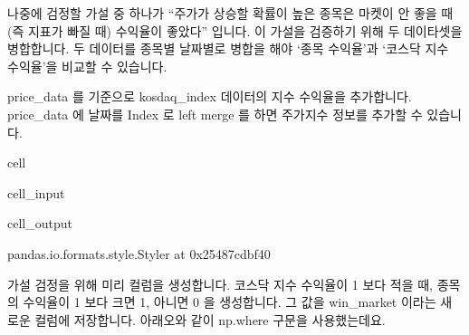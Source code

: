 \documentclass[letterpaper,10pt,english]{jupyterBook}
\begin{document}
\sphinxAtStartPar
 나중에 검정할 가설 중 하나가 “주가가 상승할 확률이 높은 종목은 마켓이 안 좋을 때(즉 지표가 빠질 때) 수익율이 좋았다” 입니다. 이 가설을 검증하기 위해 두 데이타셋을 병합합니다. 두 데이터를 종목별 날짜별로 병합을 해야 ‘종목 수익율’과 ‘코스닥 지수 수익율’을 비교할 수 있습니다.

\sphinxAtStartPar
price\_data 를 기준으로 kosdaq\_index 데이터의 지수 수익율을 추가합니다. price\_data 에 날짜를 Index 로 left merge 를 하면 주가지수 정보를 추가할 수 있습니다.

\begin{sphinxuseclass}{cell}\begin{sphinxVerbatimInput}

\begin{sphinxuseclass}{cell_input}
\begin{sphinxVerbatim}[commandchars=\\\{\}]
  \PYG{p}{[}\PYG{p}{]}   
\end{sphinxVerbatim}

\end{sphinxuseclass}\end{sphinxVerbatimInput}
\begin{sphinxVerbatimOutput}

\begin{sphinxuseclass}{cell_output}
\begin{sphinxVerbatim}[commandchars=\\\{\}]
\PYGZlt{}pandas.io.formats.style.Styler at 0x25487cdbf40\PYGZgt{}
\end{sphinxVerbatim}

\end{sphinxuseclass}\end{sphinxVerbatimOutput}

\end{sphinxuseclass}
\sphinxAtStartPar
가설 검정을 위해 미리 컬럼을 생성합니다. 코스닥 지수 수익율이 1 보다 적을 때, 종목의 수익율이 1 보다 크면 1, 아니면 0 을 생성합니다. 그 값을 win\_market 이라는 새로운 컬럼에 저장합니다. 아래오와 같이 np.where 구문을 사용했는데요.
\end{document}
